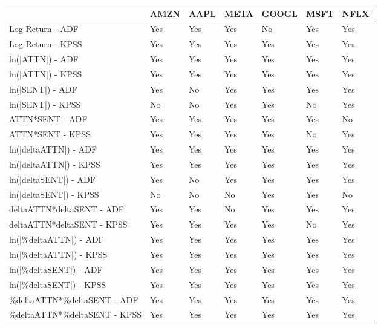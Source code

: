 \begin{tabular}{lllllll}
\toprule
{} & AMZN & AAPL & META & GOOGL & MSFT & NFLX \\
\midrule
Log Return - ADF             &  Yes &  Yes &  Yes &    No &  Yes &  Yes \\
Log Return - KPSS            &  Yes &  Yes &  Yes &   Yes &  Yes &  Yes \\
ln(|ATTN|) - ADF             &  Yes &  Yes &  Yes &   Yes &  Yes &  Yes \\
ln(|ATTN|) - KPSS            &  Yes &  Yes &  Yes &   Yes &  Yes &  Yes \\
ln(|SENT|) - ADF             &  Yes &   No &  Yes &   Yes &  Yes &  Yes \\
ln(|SENT|) - KPSS            &   No &   No &  Yes &   Yes &   No &  Yes \\
ATTN*SENT - ADF              &  Yes &  Yes &  Yes &   Yes &  Yes &   No \\
ATTN*SENT - KPSS             &  Yes &  Yes &  Yes &   Yes &   No &  Yes \\
ln(|deltaATTN|) - ADF        &  Yes &  Yes &  Yes &   Yes &  Yes &  Yes \\
ln(|deltaATTN|) - KPSS       &  Yes &  Yes &  Yes &   Yes &  Yes &  Yes \\
ln(|deltaSENT|) - ADF        &  Yes &   No &  Yes &   Yes &  Yes &  Yes \\
ln(|deltaSENT|) - KPSS       &   No &   No &   No &   Yes &  Yes &   No \\
deltaATTN*deltaSENT - ADF    &  Yes &  Yes &   No &   Yes &  Yes &  Yes \\
deltaATTN*deltaSENT - KPSS   &  Yes &  Yes &  Yes &   Yes &   No &  Yes \\
ln(|\%deltaATTN|) - ADF       &  Yes &  Yes &  Yes &   Yes &  Yes &  Yes \\
ln(|\%deltaATTN|) - KPSS      &  Yes &  Yes &  Yes &   Yes &  Yes &  Yes \\
ln(|\%deltaSENT|) - ADF       &  Yes &  Yes &  Yes &   Yes &  Yes &  Yes \\
ln(|\%deltaSENT|) - KPSS      &  Yes &  Yes &  Yes &   Yes &  Yes &  Yes \\
\%deltaATTN*\%deltaSENT - ADF  &  Yes &  Yes &  Yes &   Yes &  Yes &  Yes \\
\%deltaATTN*\%deltaSENT - KPSS &  Yes &  Yes &  Yes &   Yes &  Yes &  Yes \\
\bottomrule
\end{tabular}
